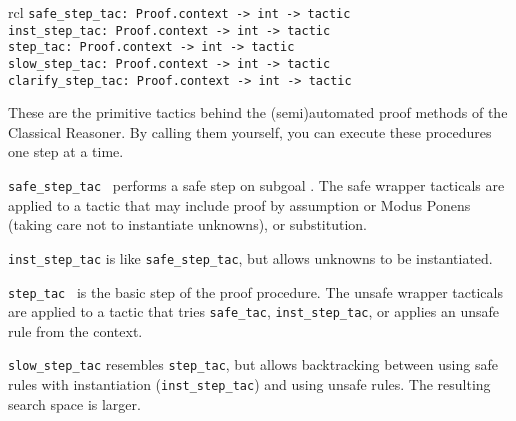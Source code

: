 \begin{isabellebody}
\begin{isamarkuptext}
\begin{description}
  \end{description}%
\end{isamarkuptext}%
\isamarkuptrue%
%
\isamarkuptrue%
%
\begin{isamarkuptext}%
\begin{matharray}{rcl}
    \verb|safe_step_tac: Proof.context -> int -> tactic| \\
    \verb|inst_step_tac: Proof.context -> int -> tactic| \\
    \verb|step_tac: Proof.context -> int -> tactic| \\
    \verb|slow_step_tac: Proof.context -> int -> tactic| \\
    \verb|clarify_step_tac: Proof.context -> int -> tactic| \\
  \end{matharray}

  These are the primitive tactics behind the (semi)automated proof
  methods of the Classical Reasoner.  By calling them yourself, you
  can execute these procedures one step at a time.

  \begin{description}

  \item \verb|safe_step_tac|~ performs a safe step on
  subgoal .  The safe wrapper tacticals are applied to a
  tactic that may include proof by assumption or Modus Ponens (taking
  care not to instantiate unknowns), or substitution.

  \item \verb|inst_step_tac| is like \verb|safe_step_tac|, but allows
  unknowns to be instantiated.

  \item \verb|step_tac|~ is the basic step of the proof
  procedure.  The unsafe wrapper tacticals are applied to a tactic
  that tries \verb|safe_tac|, \verb|inst_step_tac|, or applies an unsafe
  rule from the context.

  \item \verb|slow_step_tac| resembles \verb|step_tac|, but allows
  backtracking between using safe rules with instantiation (\verb|inst_step_tac|) and using unsafe rules.  The resulting search space
  is larger.


\end{description}
\end{isamarkuptext}
\end{isabellebody}
